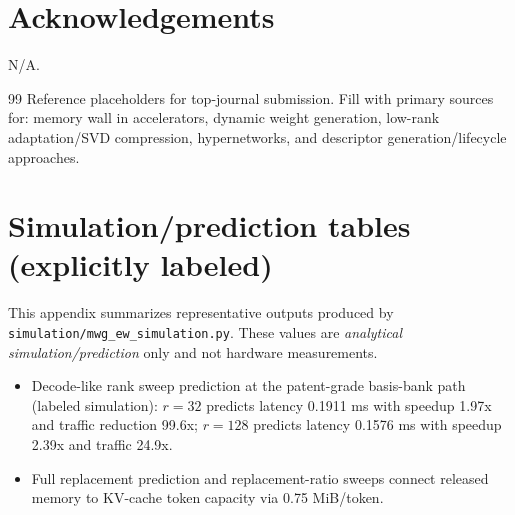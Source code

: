 \documentclass[11pt]{article}
\begin{document}
\section*{Acknowledgements}
N/A.

\begin{thebibliography}{99}
 Reference placeholders for top-journal submission. Fill with primary sources for: memory wall in accelerators, dynamic weight generation, low-rank adaptation/SVD compression, hypernetworks, and descriptor generation/lifecycle approaches.
\end{thebibliography}

\appendix
\section{Simulation/prediction tables (explicitly labeled)}
This appendix summarizes representative outputs produced by \texttt{simulation/mwg\_ew\_simulation.py}. These values are 
\emph{analytical simulation/prediction} only and not hardware measurements.

\begin{itemize}[leftmargin=1.2em]
  \item Decode-like rank sweep prediction at the patent-grade basis-bank path (labeled simulation): $r=32$ predicts latency 0.1911 ms with speedup 1.97x and traffic reduction 99.6x; $r=128$ predicts latency 0.1576 ms with speedup 2.39x and traffic 24.9x.
  \item Full replacement prediction and replacement-ratio sweeps connect released memory to KV-cache token capacity via 0.75 MiB/token.
\end{itemize}
\end{document}
